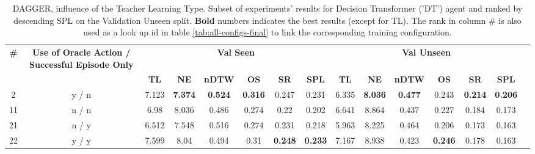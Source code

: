 \begin{table}
\centering
\caption{\label{tab:dt_dagger_pe_oa}DAGGER, influence of the Teacher Learning Type. Subset of experiments' results for Decision Transformer ('DT') agent and ranked by descending SPL on the Validation Unseen split. \textbf{Bold} numbers indicates the best results (except for TL). The rank in column \# is also used as a look up id in table \ref{tab:all-configs-final} to link the corresponding training configuration.}
\begin{tabular}{@{\hskip3pt}c@{\hskip3pt}c@{\hskip3pt}c@{\hskip3pt}c@{\hskip3pt}c@{\hskip3pt}c@{\hskip3pt}c@{\hskip3pt}c@{\hskip3pt}c@{\hskip3pt}c@{\hskip3pt}c@{\hskip3pt}c@{\hskip3pt}c@{\hskip3pt}c@{\hskip3pt}c}
\toprule
                                  \textbf{\#} & \textbf{ Use of Oracle Action / Successful Episode Only} & \multicolumn{6}{c}{\textbf{Val Seen}} & \multicolumn{6}{c}{\textbf{Val Unseen}} \\
\cmidrule(l){3-8}\cmidrule(l){9-14}\textbf{~} &                                               \textbf{~} &       \textbf{TL} &     \textbf{NE} &   \textbf{nDTW} &     \textbf{OS} &     \textbf{SR} &    \textbf{SPL} &         \textbf{TL} &     \textbf{NE} &   \textbf{nDTW} &     \textbf{OS} &     \textbf{SR} &    \textbf{SPL} \\
\midrule
                                            2 &                                              y / n &             7.123 &  \textbf{7.374} &  \textbf{0.524} &  \textbf{0.316} &           0.247 &           0.231 &               6.335 &  \textbf{8.036} &  \textbf{0.477} &           0.243 &  \textbf{0.214} &  \textbf{0.206} \\
                                           11 &                                              n / n &              6.98 &           8.036 &           0.486 &           0.274 &            0.22 &           0.202 &               6.641 &           8.864 &           0.437 &           0.227 &           0.184 &           0.173 \\
                                           21 &                                              n / y &             6.512 &           7.548 &           0.516 &           0.274 &           0.231 &           0.218 &               5.963 &           8.225 &           0.464 &           0.206 &           0.173 &           0.163 \\
                                           22 &                                              y / y &             7.599 &            8.04 &           0.494 &            0.31 &  \textbf{0.248} &  \textbf{0.233} &               7.167 &           8.938 &           0.423 &  \textbf{0.246} &           0.178 &           0.163 \\
\bottomrule
\end{tabular}
\end{table}
